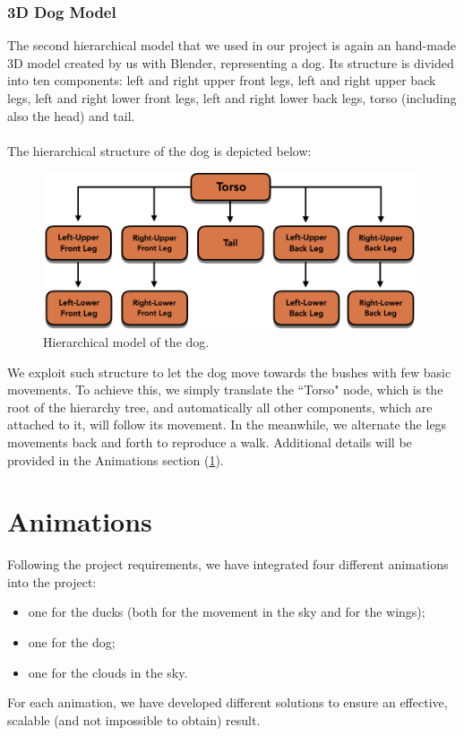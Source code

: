 \documentclass[12pt,a4paper]{article}
\begin{document}
	\subsubsection{3D Dog Model}
	The second hierarchical model that we used in our project is again an hand-made 3D model created by us with Blender, representing a dog. Its structure is divided into ten components: left and right upper front legs, left and right upper back legs, left and right lower front legs, left and right lower back legs, torso (including also the head) and tail. 
	\\\\The hierarchical structure of the dog is depicted below: 
	\begin{figure}[hbt!]
		\centering
		\includegraphics[width=0.98\textwidth]{hier_dog}
		\caption{Hierarchical model of the dog.}
		\label{fig3}
	\end{figure}
	\hfill \break We exploit such structure to let the dog move towards the bushes with few basic movements. To achieve this, we simply translate the ``Torso" node, which is the root of the hierarchy tree, and automatically all other components, which are attached to it, will follow its movement. In the meanwhile, we alternate the legs movements back and forth to reproduce a walk. Additional details will be provided in the Animations section (\ref{anim}).
	
	\section{Animations}\label{anim}
	Following the project requirements, we have integrated four different animations into the project:
	\begin{itemize}
		\item one for the ducks (both for the movement in the sky and for the wings);
		\item one for the dog;
		\item one for the clouds in the sky.
	\end{itemize}
	For each animation, we have developed different solutions to ensure an effective, scalable (and not impossible to obtain) result.	
\end{document}
